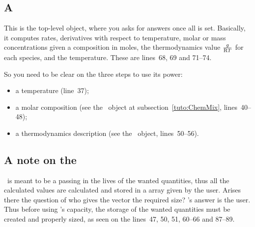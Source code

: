 \subsection{A \KineticsEvaluator}
\label{tuto:KineticsEval}

This is the top-level object, where you asks for
answers once all is set. Basically, it computes
rates, derivatives with respect to temperature,
molar or mass concentrations given a composition in
moles, the thermodynamics value $\frac{\gibbs}{\Rg\Temp}$
for each species, and the temperature.
These are lines~68, 69 and 71--74.

So you need to be clear on the three steps to use its power:
\begin{itemize}
\item a temperature (line~37);
\item a molar composition (see the \ChemicalMixture\ object
        at subsection~\ref{tuto:ChemMix}, lines~40--48);
\item a thermodynamics description (see the \CEAThermodynamics\
        object, lines~50--56).
\end{itemize}

\subsection{A note on the }

\Antioch\ is meant to be a passing in the lives of
the wanted quantities, thus all the calculated values
are calculated and stored in a array given by the
user. Arises there the question of who gives the vector
the required size? \Antioch's answer is the user. Thus
before using \Antioch's capacity, the storage of the
wanted quantities must be created and properly sized,
as seen on the lines~47, 50, 51, 60--66 and 87--89.
